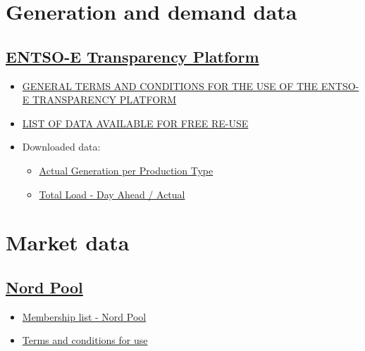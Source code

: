 \hypertarget{generation-and-demand-data}{%
\section{Generation and demand data}\label{generation-and-demand-data}}

\hypertarget{entso-e-transparency-platform}{%
\subsection{\texorpdfstring{\href{https://transparency.entsoe.eu/}{ENTSO-E
Transparency
Platform}}{ENTSO-E Transparency Platform}}\label{entso-e-transparency-platform}}

\begin{itemize}
\tightlist
\item
  \href{https://docstore.entsoe.eu/Documents/MC\%20documents/Transparency\%20Platform/ENTSOE_Transparency_Terms_Conditions.pdf}{GENERAL
  TERMS AND CONDITIONS FOR THE USE OF THE ENTSO-E TRANSPARENCY PLATFORM}
\item
  \href{https://docstore.entsoe.eu/Documents/MC\%20documents/Transparency\%20Platform/List_of_Data_available_for_reuse.pdf}{LIST
  OF DATA AVAILABLE FOR FREE RE-USE}
\item
  Downloaded data:

  \begin{itemize}
  \tightlist
  \item
    \href{https://transparency.entsoe.eu/generation/r2/actualGenerationPerProductionType/show}{Actual
    Generation per Production Type}
  \item
    \href{https://transparency.entsoe.eu/load-domain/r2/totalLoadR2/show}{Total
    Load - Day Ahead / Actual}
  \end{itemize}
\end{itemize}

\hypertarget{market-data}{%
\section{Market data}\label{market-data}}

\hypertarget{nord-pool}{%
\subsection{\texorpdfstring{\href{https://www.nordpoolgroup.com/historical-market-data/}{Nord
Pool}}{Nord Pool}}\label{nord-pool}}

\begin{itemize}
\tightlist
\item
  \href{https://www.nordpoolgroup.com/trading/join-our-markets/membership/}{Membership
  list - Nord Pool}
\item
  \href{https://www.nordpoolgroup.com/About-us/Terms-and-conditions-for-use/}{Terms
  and conditions for use}
\end{itemize}

